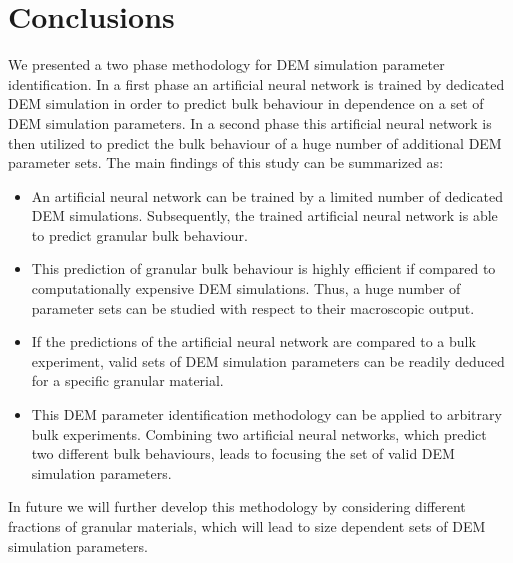\section{Conclusions}
\label{sec:conclusions}

We presented a two phase methodology for DEM simulation parameter
identification. In a first phase an artificial neural network is 
trained by dedicated DEM simulation in order to predict bulk 
behaviour in dependence on a set of DEM simulation parameters. 
In a second phase this artificial neural network is then utilized 
to predict the bulk behaviour of a huge number of additional DEM parameter sets. 
The main findings of this study can be summarized as:
\begin{itemize}
  \item{An artificial neural network can be trained by a limited number of dedicated DEM simulations. 
  		Subsequently, the trained artificial neural network is able to predict
  		granular bulk behaviour.}
  \item{This prediction of granular bulk behaviour is highly efficient if
  		compared to computationally expensive DEM simulations.
  		Thus, a huge number of parameter sets can be studied with respect to their
  		macroscopic output.}
  \item{If the predictions of the artificial neural network are compared to a bulk experiment, 
  		valid sets of DEM simulation parameters can be readily deduced for a
  		specific granular material.}
  \item{This DEM parameter identification methodology can be applied to arbitrary bulk experiments. 
  		Combining two artificial neural networks, which predict two different bulk
  		behaviours, leads to focusing the set of valid DEM simulation parameters.}
\end{itemize}
In future we will further develop this methodology by considering different
fractions of granular materials, which will lead to size dependent sets of DEM simulation parameters.
